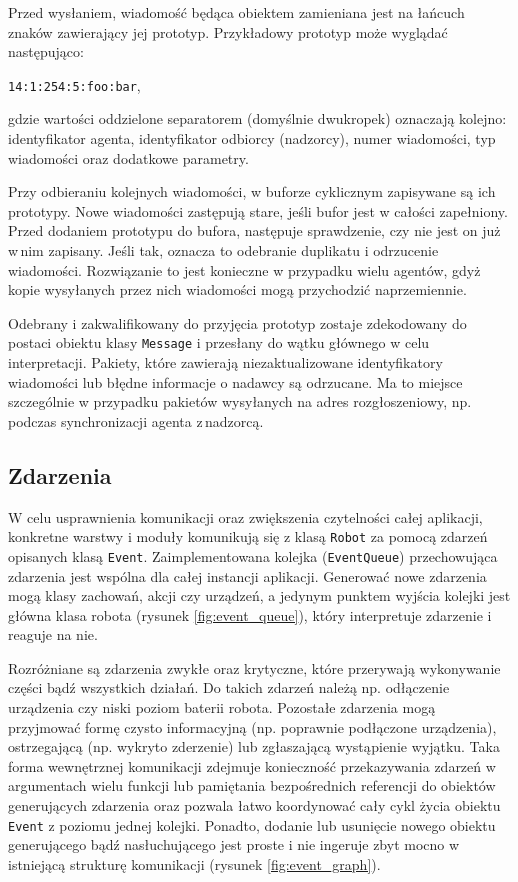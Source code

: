 Przed wysłaniem, wiadomość będąca obiektem zamieniana jest na łańcuch znaków zawierający jej prototyp. Przykładowy prototyp może wyglądać następująco:
\begin{center} {\tt 14:1:254:5:foo:bar},\\ \end{center}
gdzie wartości oddzielone separatorem (domyślnie dwukropek) oznaczają kolejno: identyfikator agenta, identyfikator odbiorcy (nadzorcy), numer wiadomości, typ\,wiadomości oraz dodatkowe parametry.

Przy odbieraniu kolejnych wiadomości, w buforze cyklicznym zapisywane są ich prototypy. Nowe wiadomości zastępują stare, jeśli bufor jest w całości zapełniony. Przed dodaniem prototypu do bufora, następuje sprawdzenie, czy nie jest on już w\,nim zapisany. Jeśli tak, oznacza to odebranie duplikatu i odrzucenie wiadomości. Rozwiązanie to jest konieczne w przypadku wielu agentów, gdyż kopie wysyłanych przez nich wiadomości mogą przychodzić naprzemiennie.

Odebrany i zakwalifikowany do przyjęcia prototyp zostaje zdekodowany do postaci obiektu klasy {\tt Message} i przesłany do wątku głównego w celu interpretacji. Pakiety, które zawierają niezaktualizowane identyfikatory wiadomości lub błędne informacje o nadawcy są odrzucane. Ma to miejsce szczególnie w przypadku pakietów wysyłanych na adres rozgłoszeniowy, np. podczas synchronizacji agenta z\,nadzorcą.

\subsection{Zdarzenia}

W celu usprawnienia komunikacji oraz zwiększenia czytelności całej aplikacji, konkretne warstwy i moduły komunikują się z klasą {\tt Robot} za pomocą zdarzeń opisanych klasą {\tt Event}. Zaimplementowana kolejka ({\tt EventQueue}) przechowująca zdarzenia jest wspólna dla całej instancji aplikacji. Generować nowe zdarzenia mogą klasy zachowań, akcji czy urządzeń, a jedynym punktem wyjścia kolejki jest główna klasa robota (rysunek \ref{fig:event_queue}), który interpretuje zdarzenie i reaguje na nie.

Rozróżniane są zdarzenia zwykłe oraz krytyczne, które przerywają wykonywanie części bądź wszystkich działań. Do takich zdarzeń należą np. odłączenie urządzenia czy niski poziom baterii robota. Pozostałe zdarzenia mogą przyjmować formę czysto informacyjną (np. poprawnie podłączone urządzenia), ostrzegającą (np. wykryto zderzenie) lub zgłaszającą wystąpienie wyjątku. Taka forma wewnętrznej komunikacji zdejmuje konieczność przekazywania zdarzeń w argumentach wielu funkcji lub pamiętania bezpośrednich referencji do obiektów generujących zdarzenia oraz pozwala łatwo koordynować cały cykl życia obiektu {\tt Event} z poziomu jednej kolejki. Ponadto, dodanie lub usunięcie nowego obiektu generującego bądź nasłuchującego jest proste i nie ingeruje zbyt mocno w istniejącą strukturę komunikacji (rysunek \ref{fig:event_graph}).

